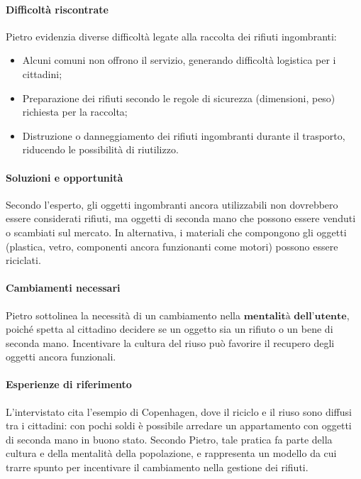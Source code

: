 \documentclass[12pt,a4paper]{article}
\begin{document}
\paragraph{Difficoltà riscontrate}

Pietro evidenzia diverse difficoltà legate alla raccolta dei rifiuti ingombranti:  
\begin{itemize}
  \item Alcuni comuni non offrono il servizio, generando difficoltà logistica per i cittadini;  
  \item Preparazione dei rifiuti secondo le regole di sicurezza (dimensioni, peso) richiesta per la raccolta;  
  \item Distruzione o danneggiamento dei rifiuti ingombranti durante il trasporto, riducendo le possibilità di riutilizzo.  
\end{itemize}

\paragraph{Soluzioni e opportunità}

Secondo l’esperto, gli oggetti ingombranti ancora utilizzabili non dovrebbero essere considerati rifiuti, ma oggetti di seconda mano che possono essere venduti o scambiati sul mercato. In alternativa, i materiali che compongono gli oggetti (plastica, vetro, componenti ancora funzionanti come motori) possono essere riciclati.  

\paragraph{Cambiamenti necessari}

Pietro sottolinea la necessità di un cambiamento nella $\textbf{mentalità}$ $\textbf{dell’utente}$, poiché spetta al cittadino decidere se un oggetto sia un rifiuto o un bene di seconda mano. Incentivare la cultura del riuso può favorire il recupero degli oggetti ancora funzionali.  

\paragraph{Esperienze di riferimento}

L’intervistato cita l’esempio di Copenhagen, dove il riciclo e il riuso sono diffusi tra i cittadini: con pochi soldi è possibile arredare un appartamento con oggetti di seconda mano in buono stato. Secondo Pietro, tale pratica fa parte della cultura e della mentalità della popolazione, e rappresenta un modello da cui trarre spunto per incentivare il cambiamento nella gestione dei rifiuti.  
\end{document}
